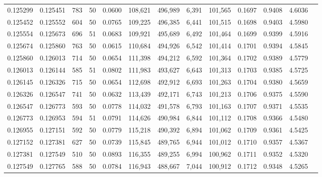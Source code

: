 \begin{tabular}{rrrrrrrrrrrrr}
0.125299 & 0.125451 &   783 &  50 &                                     0.0600 & 108,621 & 496,989 &   6,391 & 101,565 & 0.1697 & 0.9408 & 4.6036 \\
0.125452 & 0.125552 &   604 &  50 &                                     0.0765 & 109,225 & 496,385 &   6,441 & 101,515 & 0.1698 & 0.9403 & 4.5980 \\
0.125554 & 0.125673 &   696 &  51 &                                     0.0683 & 109,921 & 495,689 &   6,492 & 101,464 & 0.1699 & 0.9399 & 4.5916 \\
0.125674 & 0.125860 &   763 &  50 &                                     0.0615 & 110,684 & 494,926 &   6,542 & 101,414 & 0.1701 & 0.9394 & 4.5845 \\
0.125860 & 0.126013 &   714 &  50 &                                     0.0654 & 111,398 & 494,212 &   6,592 & 101,364 & 0.1702 & 0.9389 & 4.5779 \\
0.126013 & 0.126144 &   585 &  51 &                                     0.0802 & 111,983 & 493,627 &   6,643 & 101,313 & 0.1703 & 0.9385 & 4.5725 \\
0.126145 & 0.126326 &   715 &  50 &                                     0.0654 & 112,698 & 492,912 &   6,693 & 101,263 & 0.1704 & 0.9380 & 4.5659 \\
0.126326 & 0.126547 &   741 &  50 &                                     0.0632 & 113,439 & 492,171 &   6,743 & 101,213 & 0.1706 & 0.9375 & 4.5590 \\
0.126547 & 0.126773 &   593 &  50 &                                     0.0778 & 114,032 & 491,578 &   6,793 & 101,163 & 0.1707 & 0.9371 & 4.5535 \\
0.126773 & 0.126953 &   594 &  51 &                                     0.0791 & 114,626 & 490,984 &   6,844 & 101,112 & 0.1708 & 0.9366 & 4.5480 \\
0.126955 & 0.127151 &   592 &  50 &                                     0.0779 & 115,218 & 490,392 &   6,894 & 101,062 & 0.1709 & 0.9361 & 4.5425 \\
0.127152 & 0.127381 &   627 &  50 &                                     0.0739 & 115,845 & 489,765 &   6,944 & 101,012 & 0.1710 & 0.9357 & 4.5367 \\
0.127381 & 0.127549 &   510 &  50 &                                     0.0893 & 116,355 & 489,255 &   6,994 & 100,962 & 0.1711 & 0.9352 & 4.5320 \\
0.127549 & 0.127765 &   588 &  50 &                                     0.0784 & 116,943 & 488,667 &   7,044 & 100,912 & 0.1712 & 0.9348 & 4.5265 \\

\end{tabular}
